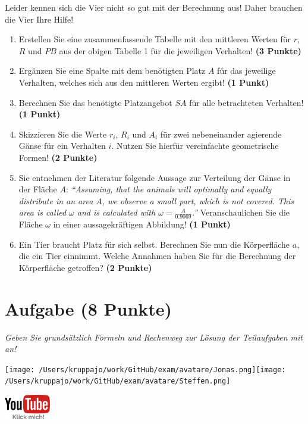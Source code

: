 \documentclass[a4paper, 9pt]{scrartcl}\usepackage[]{graphicx}\usepackage[]{xcolor}
\begin{document}
Leider kennen sich die Vier nicht so gut mit der Berechnung aus! Daher brauchen die Vier Ihre Hilfe!

\begin{enumerate}
\item Erstellen Sie eine zusammenfassende Tabelle mit den mittleren Werten für $r$, $R$ und $PB$ aus der obigen Tabelle 1 für die jeweiligen Verhalten! \textbf{(3 Punkte)}
\item Ergänzen Sie eine Spalte mit dem benötigten Platz $A$ für das jeweilige Verhalten, welches sich aus den mittleren Werten ergibt! \textbf{(1 Punkt)}
\item Berechnen Sie das benötigte Platzangebot $SA$ für alle betrachteten Verhalten! \textbf{(1 Punkt)}
\item Skizzieren Sie die Werte $r_i$, $R_i$ und $A_i$ für zwei nebeneinander agierende Gänse für ein Verhalten $i$. Nutzen Sie hierfür vereinfachte geometrische Formen! \textbf{(2 Punkte)}
\item Sie entnehmen der Literatur folgende Aussage zur Verteilung der Gänse in der Fläche $A$: \textit{"`Assuming, that the animals will optimally and equally distribute in an area $A$, we observe a
    small part, which is not covered. This area is called $\omega$ and is calculated with $\omega = \tfrac{A}{0.9069}$."'} Veranschaulichen Sie die Fläche $\omega$ in einer aussagekräftigen Abbildung!  \textbf{(1 Punkt)}
\item Ein Tier braucht Platz für sich selbst. Berechnen Sie nun die Körperfläche $a$, die ein Tier einnimmt. Welche Annahmen haben Sie für die Berechnung der Körperfläche getroffen? \textbf{(2 Punkte)}
\end{enumerate}



 
\clearpage

\section{Aufgabe \hfill (8 Punkte)}

\textit{Geben Sie grundsätzlich Formeln und Rechenweg zur Lösung der Teilaufgaben mit an!} \\[1Ex]
 

 
\begin{minipage}[t]{0.5\textwidth}
\texttt{[image: /Users/kruppajo/work/GitHub/exam/avatare/Jonas.png]}\hspace{-4mm}\texttt{[image: /Users/kruppajo/work/GitHub/exam/avatare/Steffen.png]}
\end{minipage}
\begin{minipage}[t]{0.5\textwidth}
\hfill
\href{https://youtu.be/1B53cVFIU7Q}{\includegraphics[width = 2cm]{img/youtube}}
\end{minipage}
\end{document}
